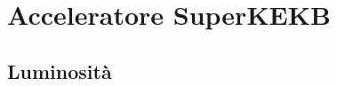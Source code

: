 \documentclass[10pt,a4paper,twoside]{report}
\begin{document}
\section{Acceleratore SuperKEKB}

\begin{comment}
La sensibilità nelle misure di precisione alla ricerca di nuova fisica, sono possibili soprattutto grazie alla complessità e alle ottime prestazioni dell'acceleratore SuperKEKB che ospita il rivelatore ermetico Belle II. Risultato di molti anni di efficiente collaborazione tra i ricercatori del laboratorio KEK e tutte le collaborazioni internazionali che partecipano all'esperimento.

SuperKEKB è un collider asimmetrico $e^{+}e^{-}$ di 3 km di circonferenza, piccato a una energia del centro di massa pari a $\sqrt{s}$ = 10.58 GeV, che corrisponde alla massa della risonanza $\Upsilon(4S)$. 

Rispetto al suo predecessore KEKB, l'attuale acceleratore ha permesso di ottenere il primato di luminosità mai raggiunta, pari a ......, utilizzando uno schema differente nell'accelerazione e scontro dei fasci, attraverso alcune migliorìe e aggiunte nelle componenti fondamentali dell'acceleratore stesso.

\begin{figure}
\texttt{[image: SuperKEKB]}
\caption{L'acceleratore SuperKEKB nel 2021. Le lettere V ed H indicano rispettivamente i collimatori verticali ed orizzontali. Ciascun anello è diviso in 12 sezioni, dalla prima chiamata D01 fino al'ultima D12.}
\label{fig:superkekb}
\end{figure}


(Andiamo attraverso le sue principali caratteristiche)
\end{comment}

\subsection{Luminosità}
\end{document}
